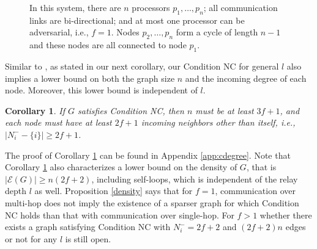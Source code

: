 \documentclass[letterpaper, 11pt]{article}
\newtheorem{corollary}[theorem]{Corollary}
\newcommand{\calE}{{\mathcal{E}}}
\begin{document}
\begin{figure}

 \centering
    \caption{In this system, there are $n$ processors $p_1, \ldots, p_n$; all communication links are bi-directional; and at most one processor can be adversarial, i.e., $f=1$. Nodes $p_2, \ldots, p_n$ form a cycle of length $n-1$ and these nodes are all connected to node $p_1$. }
    \label{example2}
    \end{figure}


Similar to \cite{Vaidya2012IABC}, as stated in our next corollary, our Condition NC for general $l$ also implies a lower bound on both the graph size $n$ and the incoming degree of each node. Moreover, this lower bound is independent of $l$.
\begin{corollary}
\label{cdegree}
If $G$ satisfies Condition NC, then
 $n$ must be at least $3f+1$, and each node must have at least $2f+1$ incoming neighbors other than itself, i.e., $|N_i^{-}-\{i\}|\ge 2f+1$.
\end{corollary}
The proof of Corollary \ref{cdegree} can be found in Appendix \ref{app:cdegree}. Note that Corollary \ref{cdegree} also characterizes a lower bound on the density of $G$, that is $\left |\calE(G)\right |\ge n(2f+2)$, including self-loops, which is independent of the relay depth $l$ as well. Proposition \ref{density} says that for $f=1$, communication over multi-hop does not imply the existence of a sparser graph for which Condition NC holds than that with communication over single-hop. For $f>1$ whether there exists a graph satisfying Condition NC with $N_i^{-}=2f+2$ and $(2f+2)n$ edges or not for any $l$ is still open.
\end{document}
